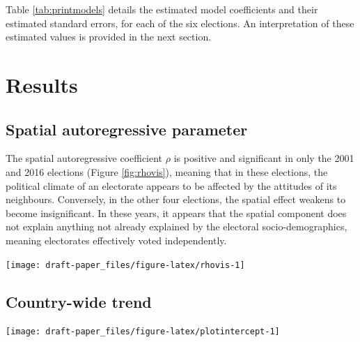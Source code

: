 \documentclass[11pt,a4paper,]{article}
\let\origfigure\figure
\let\endorigfigure\endfigure
\renewenvironment{figure}[1][2] {
    \expandafter\origfigure\expandafter[htbp]
} {
    \endorigfigure
}
\begin{document}
Table \ref{tab:printmodels} details the estimated model coefficients and
their estimated standard errors, for each of the six elections. An
interpretation of these estimated values is provided in the next
section.

\section{Results}\label{results}

\subsection{Spatial autoregressive
parameter}\label{spatial-autoregressive-parameter}

The spatial autoregressive coefficient \(\rho\) is positive and
significant in only the 2001 and 2016 elections (Figure
\ref{fig:rhovis}), meaning that in these elections, the political
climate of an electorate appears to be affected by the attitudes of its
neighbours. Conversely, in the other four elections, the spatial effect
weakens to become insignificant. In these years, it appears that the
spatial component does not explain anything not already explained by the
electoral socio-demographics, meaning electorates effectively voted
independently.

\begin{figure}[h]

{\centering \texttt{[image: draft-paper\_files/figure-latex/rhovis-1]} 

}

\caption{Estimates of the spatial autoregressive parameter for each of the six elections, reported with their individual 95\% confidence intervals. Only in 2001 and 2016 is there a significant spatial component.}\label{fig:rhovis}
\end{figure}

\subsection{Country-wide trend}\label{country-wide-trend}

\begin{figure}[h]

{\centering \texttt{[image: draft-paper\_files/figure-latex/plotintercept-1]} 

}

\caption{Estimated intercept for each election, which represents the two-party preferred vote for an electorate with mean characteristics.}\label{fig:plotintercept}
\end{figure}
\end{document}
